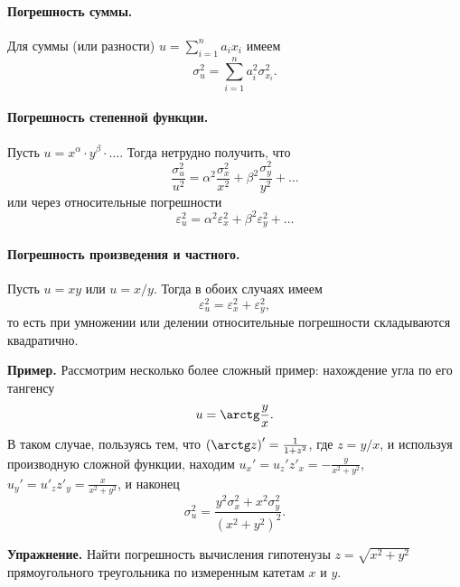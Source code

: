 \documentclass[10pt]{article}
\begin{document}
\paragraph{Погрешность суммы.}

Для суммы (или разности) $u=\sum\limits _{i=1}^{n}a_{i}x_{i}$ имеем
\begin{equation}
\sigma_{u}^{2}=\sum_{i=1}^{n}a_{i}^{2}\sigma_{x_{i}}^{2}.
\end{equation}


\paragraph{Погрешность степенной функции.}

Пусть $u=x^{\alpha}\cdot y^{\beta}\cdot\ldots$. Тогда нетрудно получить,
что
\[
\frac{\sigma_{u}^{2}}{u^{2}}=\alpha^{2}\frac{\sigma_{x}^{2}}{x^{2}}+\beta^{2}\frac{\sigma_{y}^{2}}{y^{2}}+\ldots
\]
или через относительные погрешности
\begin{equation}
\varepsilon_{u}^{2}=\alpha^{2}\varepsilon_{x}^{2}+\beta^{2}\varepsilon_{y}^{2}+\ldots\label{eq:espilon_power}
\end{equation}


\paragraph{Погрешность произведения и частного.}

Пусть $u=xy$ или $u=x/y$. Тогда в обоих случаях имеем
\begin{equation}
\varepsilon_{u}^{2}=\varepsilon_{x}^{2}+\varepsilon_{y}^{2},
\end{equation}
то есть при умножении или делении относительные погрешности складываются
квадратично.

\textbf{\footnotesize{}Пример.}{\footnotesize{} Рассмотрим несколько
более сложный пример: нахождение угла по его тангенсу 
\[
u=\arctg\frac{y}{x}.
\]
В таком случае, пользуясь тем, что $\left(\arctg z\right)'=\frac{1}{1+z^{2}}$,
где $z=y/x$, и используя производную сложной функции, находим $u_{x}'=u_{z}'z'_{x}=-\frac{y}{x^{2}+y^{2}}$,
$u_{y}'=u'_{z}z'_{y}=\frac{x}{x^{2}+y^{2}}$, и наконец 
\[
\sigma_{u}^{2}=\frac{y^{2}\sigma_{x}^{2}+x^{2}\sigma_{y}^{2}}{\left(x^{2}+y^{2}\right)^{2}}.
\]
}{\footnotesize\par}

\textbf{\footnotesize{}Упражнение.}{\footnotesize{} Найти погрешность
вычисления гипотенузы $z=\sqrt{x^{2}+y^{2}}$ прямоугольного треугольника
по измеренным катетам $x$ и $y$.}{\footnotesize\par}
\end{document}
